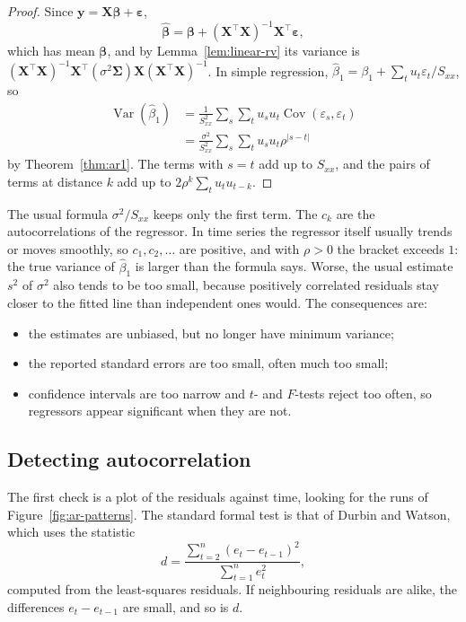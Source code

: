 \documentclass[11pt,a4paper]{article}
\numberwithin{equation}{section}
\theoremstyle{definition}
\begin{document}
\begin{proof}
Since $\mathbf{y} = \mathbf{X}\boldsymbol\beta + \boldsymbol\varepsilon$,
\[
\hat{\boldsymbol\beta} = \boldsymbol\beta + (\mathbf{X}^\top\mathbf{X})^{-1}\mathbf{X}^\top\boldsymbol\varepsilon ,
\]
which has mean $\boldsymbol\beta$, and by Lemma~\ref{lem:linear-rv} its variance is $(\mathbf{X}^\top\mathbf{X})^{-1}\mathbf{X}^\top(\sigma^2\boldsymbol\Sigma)\mathbf{X}(\mathbf{X}^\top\mathbf{X})^{-1}$. In simple regression,
$\hat\beta_1 = \beta_1 + \sum_tu_t\varepsilon_t/S_{xx}$, so
\begin{align*}
\operatorname{Var}(\hat\beta_1) &= \frac{1}{S_{xx}^2}\sum_s\sum_tu_su_t\operatorname{Cov}(\varepsilon_s, \varepsilon_t) \\
&= \frac{\sigma^2}{S_{xx}^2}\sum_s\sum_tu_su_t\rho^{|s-t|}
\end{align*}
by Theorem~\ref{thm:ar1}. The terms with $s = t$ add up to $S_{xx}$, and the pairs of terms at distance $k$ add up to
$2\rho^k\sum_tu_tu_{t-k}$.
\end{proof}

The usual formula $\sigma^2/S_{xx}$ keeps only the first term. The $c_k$ are the autocorrelations of the regressor. In
time series the regressor itself usually trends or moves smoothly, so $c_1, c_2, \dots$ are positive, and with $\rho > 0$
the bracket exceeds $1$: the true variance of $\hat\beta_1$ is larger than the formula says. Worse, the usual estimate $s^2$
of $\sigma^2$ also tends to be too small, because positively correlated residuals stay closer to the fitted line than
independent ones would. The consequences are:
\begin{itemize}
\item the estimates are unbiased, but no longer have minimum variance;
\item the reported standard errors are too small, often much too small;
\item confidence intervals are too narrow and $t$- and $F$-tests reject too often, so regressors appear
significant when they are not.
\end{itemize}

\subsection{Detecting autocorrelation}
The first check is a plot of the residuals against time, looking for the runs of Figure~\ref{fig:ar-patterns}. The
standard formal test is that of Durbin and Watson, which uses the statistic
\[
d = \frac{\sum_{t=2}^n(e_t - e_{t-1})^2}{\sum_{t=1}^ne_t^2} ,
\]
computed from the least-squares residuals. If neighbouring residuals are alike, the differences
$e_t - e_{t-1}$ are small, and so is $d$.
\end{document}
